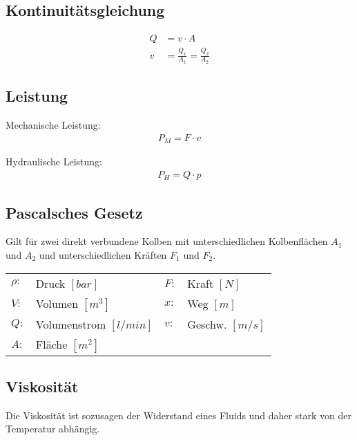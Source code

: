 \documentclass[landscape,a4paper,10pt]{article}
\begin{document}
\begin{multicols*}{3}
\subsection{Kontinuitätsgleichung}
\begin{align*}
Q &= v \cdot A \tag{Massenerhalt} \\
v &= \frac{Q_1}{A_1} = \frac{Q_2}{A_2}
\end{align*}

\subsection{Leistung}
Mechanische Leistung:
\begin{align*}
P_M = F \cdot v
\end{align*}

Hydraulische Leistung:
\begin{align*}
P_H = Q \cdot p
\end{align*}


%




\subsection{Pascalsches Gesetz}
Gilt für zwei direkt verbundene Kolben mit unterschiedlichen Kolbenflächen $A_1$ und $A_2$ und unterschiedlichen Kräften $F_1$ und $F_2$. 
\begin{tabular}{llll}
$\rho:$ & Druck $[bar]$ & $F:$ & Kraft $[N]$ \\
$V:$ & Volumen $[m^3]$ & $x:$ & Weg $[m]$ \\
$Q:$ & Volumenstrom $[l/min]$ & $v:$ & Geschw. $[m/s]$\\
$A:$ & Fläche $[m^2]$
\end{tabular}

\vfill
\columnbreak
\subsection{Viskosität}
Die Viskosität ist sozusagen der Widerstand eines Fluids und daher stark von der Temperatur abhängig.


\end{multicols*}
\end{document}
